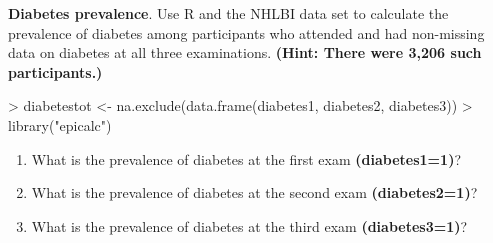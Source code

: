 \documentclass{article}
\begin{document}
\pagebreak
\textbf{Diabetes prevalence}. Use R and the NHLBI data set to calculate the prevalence of diabetes among participants who attended and had non-missing data on diabetes at all three examinations. \textbf{(Hint: There were 3,206 such participants.)}

\begin{Schunk}
\begin{Sinput}
> diabetestot <- na.exclude(data.frame(diabetes1, diabetes2, diabetes3))
> library("epicalc")
\end{Sinput}
\end{Schunk}

\begin{enumerate}
  \item What is the prevalence of diabetes at the first exam \textbf{(diabetes1=1)}?
\begin{Schunk}
\end{Schunk}
  \item What is the prevalence of diabetes at the second exam \textbf{(diabetes2=1)}?
\begin{Schunk}
\end{Schunk}
  \item What is the prevalence of diabetes at the third exam \textbf{(diabetes3=1)}?
\begin{Schunk}
\end{Schunk}
\end{enumerate}\\
\end{document}
